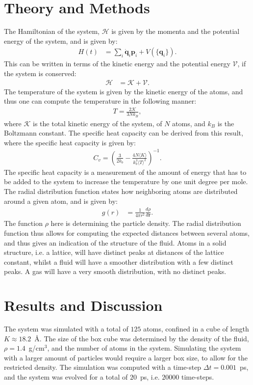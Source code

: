 \documentclass[a4paper]{article}
\newcommand{\average}[1]{\langle #1 \rangle}
\begin{document}
\section{Theory and Methods}
The Hamiltonian of the system, $\mathcal{H}$ is given by the momenta and the potential energy of the system, and is given by:
\begin{align}
    H(t) &= \sum_i \dot{\mathbf{q}}_i\mathbf{p}_i + V(\{\mathbf{q}_i\}). \label{eq: Hamiltonian}
\end{align}This can be written in terms of the kinetic energy and the potential energy $\mathcal{V}$, if the system is conserved:
\begin{align*}
    \mathcal{H} &= \mathcal{K} + \mathcal{V}.
\end{align*}
The temperature of the system is given by the kinetic energy of the atoms, and thus one can compute the temperature in the following manner:
\begin{align}
    T = \frac{2\mathcal{K}}{3Nk_B},\label{eq: Temperature}
\end{align}where $\mathcal{K}$ is the total kinetic energy of the system, of $N$ atoms, and $k_B$ is the Boltzmann constant.
The specific heat capacity can be derived from this result, where the specific heat capacity is given by:
\begin{align}
    C_v = \left(\frac{3}{2k_b} - \frac{4N\average{K}}{k_b^3\average{T}^2}\right)^{-1}\label{eq: heat capacity}.
\end{align}The specific heat capacity is a measurement of the amount of energy that has to be added to the system to increase the temperature by one unit degree per mole.
The radial distribution function states how neighboring atoms are distributed around a given atom, and is given by:
\begin{align}
    g(r) &= \frac{1}{4\pi r^2}\frac{d\rho}{d\mathbf{r}} \label{eq: radial}.
\end{align}The function $\rho$ here is determining the particle density. The radial distribution function thus allows for computing the expected distances between several atoms, and thus gives an indication of the structure of the fluid.
Atoms in a solid structure, i.e. a lattice, will have distinct peaks at distances of the lattice constant, whilst a fluid will have a smoother distribution with a few distinct peaks. A gas will have a very smooth distribution, with no distinct peaks.

\newpage
\section{Results and Discussion}
The system was simulated with a total of $125$ atoms, confined in a cube of length $K \approx 18.2$~Å. The size of the box cube was determined by the density of the fluid, $\rho = 1.4$~g/cm$^3$, and the number of atoms in the system. 
Simulating the system with a larger amount of particles would require a larger box size, to allow for the restricted density.
The simulation was computed with a time-step $\Delta t = 0.001$~ps, and the system was evolved for a total of $20$~ps, i.e. $20000$ time-steps.
\end{document}
